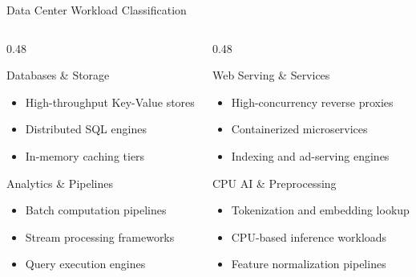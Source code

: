 \documentclass[aspectratio=169,11pt,t]{beamer}
\begin{document}
\begin{frame}{Data Center Workload Classification}
\begin{columns}[T,onlytextwidth]
\begin{column}{0.48\textwidth}
\begin{block}{Databases \& Storage}
\begin{itemize}\setlength{\itemsep}{4pt}
  \item High-throughput Key-Value stores
  \item Distributed SQL engines
  \item In-memory caching tiers
\end{itemize}
\end{block}

\vspace{0.15cm}
\begin{block}{Analytics \& Pipelines}
\begin{itemize}\setlength{\itemsep}{4pt}
  \item Batch computation pipelines
  \item Stream processing frameworks
  \item Query execution engines
\end{itemize}
\end{block}
\end{column}

\begin{column}{0.48\textwidth}
\begin{block}{Web Serving \& Services}
\begin{itemize}\setlength{\itemsep}{4pt}
  \item High-concurrency reverse proxies
  \item Containerized microservices
  \item Indexing and ad-serving engines
\end{itemize}
\end{block}

\vspace{0.15cm}
\begin{block}{CPU AI \& Preprocessing}
\begin{itemize}\setlength{\itemsep}{4pt}
  \item Tokenization and embedding lookup
  \item CPU-based inference workloads
  \item Feature normalization pipelines
\end{itemize}
\end{block}
\end{column}
\end{columns}
\end{frame}
\end{document}
